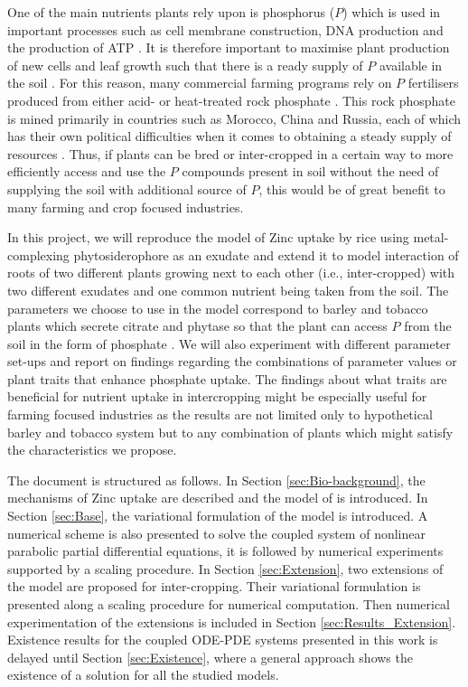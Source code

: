 \documentclass[11pt]{article}
\numberwithin{equation}{section}
\begin{document}
One of the main nutrients plants rely upon is phosphorus ($P$) which is used in important processes such as cell membrane construction, DNA production and the production of ATP \cite{vysotskaya_2016}. It is therefore important to maximise plant production of new cells and leaf growth such that there is a ready supply of $P$ available in the soil \cite{vysotskaya_2016}. For this reason, many commercial farming programs rely on $P$ fertilisers produced from either acid- or heat-treated rock phosphate \cite{PhosporusRecoveryandRecycling}. This rock phosphate is mined primarily in countries such as Morocco, China and Russia, each of which has their own political difficulties when it comes to obtaining a steady supply of resources \cite{fact.mr_2021}. Thus, if plants can be bred or inter-cropped in a certain way to more efficiently access and use the $P$ compounds present in soil without the need of supplying the soil with additional source of $P$, this would be of great benefit to many farming and crop focused industries.

In this project, we will reproduce the model of Zinc uptake by rice using metal-complexing phytosiderophore as an exudate \cite{Ptashnyk-2011} and extend it to model interaction of roots of two different plants growing next to each other (i.e., inter-cropped) with two different exudates and one common nutrient being taken from the soil. The parameters we choose to use in the model correspond to barley and tobacco plants which secrete citrate and phytase so that the plant can access $P$ from the soil in the form of phosphate \cite{giles_richardson2018}. We will also experiment with different parameter set-ups and report on findings regarding the combinations of parameter values or plant traits that enhance phosphate uptake. The findings about what traits are beneficial for nutrient uptake in intercropping might be especially useful for farming focused industries as the results are not limited only to hypothetical barley and tobacco system but to any combination of plants which might satisfy the characteristics we propose. 

The document is structured as follows. In Section \ref{sec:Bio-background}, the mechanisms of Zinc uptake are described and the model of \cite{Ptashnyk-2011} is introduced. 
In Section \ref{sec:Base}, the variational formulation of the model is introduced. A numerical scheme is also presented to solve the coupled system of nonlinear parabolic partial differential equations, it is followed by numerical experiments supported by a scaling procedure.  In Section \ref{sec:Extension}, two extensions of the model are proposed for inter-cropping. Their variational formulation is presented along a scaling procedure for numerical computation. Then numerical experimentation of the extensions is included in Section \ref{sec:Results_Extension}. Existence results for the coupled ODE-PDE systems presented in this work is delayed until Section \ref{sec:Existence}, where a general approach shows the existence of a solution for all the studied models.
\end{document}
